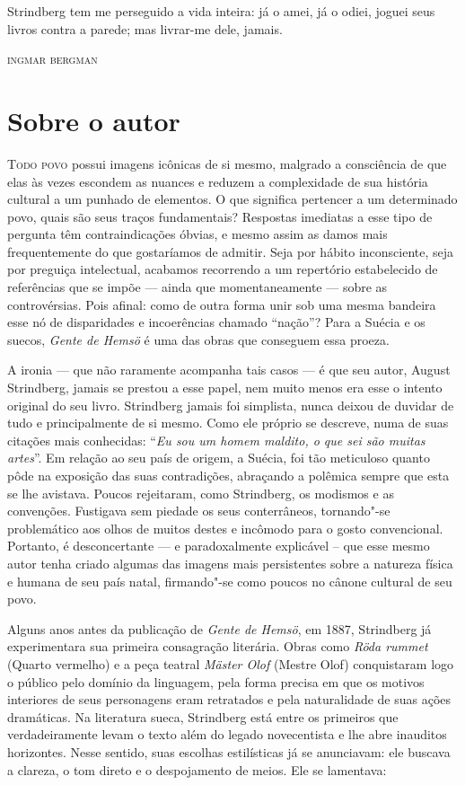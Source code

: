 


\epigraph{Strindberg tem me perseguido a vida inteira: já o amei, já o odiei, 
joguei seus livros contra a parede; mas livrar-me dele, jamais.}{\textsc{ingmar bergman}}

\section{Sobre o autor}


\noindent\textsc{Todo povo} possui imagens icônicas de si mesmo, 
malgrado a consciência de que elas às vezes escondem as nuances e 
reduzem a complexidade de sua história cultural a um punhado de elementos. 
O que significa pertencer a um determinado povo, quais são seus traços fundamentais? 
Respostas imediatas a esse tipo de pergunta têm contraindicações óbvias, e
mesmo assim as damos mais frequentemente do que gostaríamos de admitir.
Seja por hábito inconsciente, seja por preguiça intelectual, acabamos
recorrendo a um repertório estabelecido de referências que se impõe --- ainda que
momentaneamente --- sobre as controvérsias.  Pois afinal: como de outra
forma unir sob uma mesma bandeira esse nó de disparidades e
incoerências chamado “nação”?  Para a Suécia e os suecos, 
\textit{Gente de Hemsö} é uma das obras que conseguem essa proeza. 

A ironia --- que não raramente acompanha tais casos --- é que seu autor,
August Strindberg, jamais se prestou a esse papel, nem muito menos era
esse o intento original do seu livro. Strindberg jamais foi simplista,
nunca deixou de duvidar de tudo e principalmente de si mesmo. Como ele
próprio se descreve, numa de suas citações mais conhecidas: ``\textit{Eu
sou um homem maldito, o que sei são muitas artes}''. Em relação ao seu
país de origem, a Suécia, foi tão meticuloso quanto pôde na exposição
das suas contradições, abraçando a polêmica sempre que esta se lhe
avistava. Poucos rejeitaram, como Strindberg, os modismos e as
convenções. Fustigava sem piedade os seus conterrâneos, tornando"-se
problemático aos olhos de muitos destes e incômodo para o gosto
convencional. Portanto, é desconcertante --- e paradoxalmente explicável
– que esse mesmo autor tenha criado algumas das imagens mais
persistentes sobre a natureza física e humana de seu país natal, 
firmando"-se como poucos no cânone cultural de seu povo. 

Alguns anos antes da publicação de \textit{Gente de Hemsö}, em 1887, Strindberg já experimentara
sua primeira consagração literária. Obras como
\textit{Röda rummet} (Quarto vermelho) e a peça teatral \textit{Mäster Olof} (Mestre Olof) 
conquistaram logo o público pelo domínio da linguagem, pela forma
precisa em que os motivos interiores de seus personagens eram
retratados e pela naturalidade de suas ações dramáticas. Na
literatura sueca, Strindberg está entre os primeiros que
verdadeiramente levam o texto além do legado novecentista
e lhe abre inauditos horizontes. Nesse sentido, suas
escolhas estilísticas já se anunciavam: ele buscava a clareza, o tom
direto e o despojamento de meios. Ele se lamentava: 

